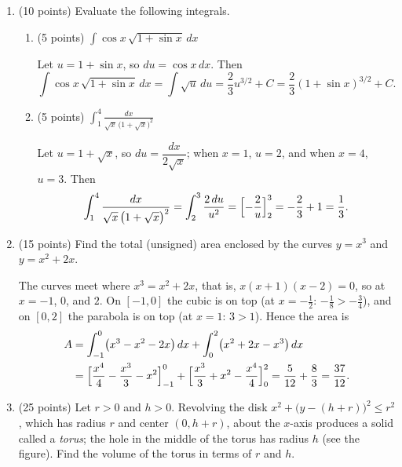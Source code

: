 \documentclass[12pt,letterpaper]{article}
\newcommand{\points}[1]{(#1 points)}
\newcommand{\workspace}{\vfill\newpage}
\begin{document}
\begin{enumerate}[label=\textbf{\arabic*.},leftmargin=2em]
  \item \points{10}
    Evaluate the following integrals.
    \begin{enumerate}[label=(\alph*)]
      \item \points{5}\quad
        $\displaystyle\int\cos x\,\sqrt{1+\sin x}\,dx$

        \begin{solution}
          Let $u=1+\sin x$, so $du=\cos x\,dx$. Then
          \[
            \int\cos x\,\sqrt{1+\sin x}\,dx=\int\sqrt{u}\,du
            =\frac23u^{3/2}+C=\frac23(1+\sin x)^{3/2}+C.
          \]
        \end{solution}
        \vfill

      \item \points{5}\quad
        $\displaystyle\int_1^4\frac{dx}{\sqrt{x}\,\bigl(1+\sqrt{x}\bigr)^2}$

        \begin{solution}
          Let $u=1+\sqrt{x}$, so $du=\dfrac{dx}{2\sqrt{x}}$; when $x=1$,
          $u=2$, and when $x=4$, $u=3$. Then
          \[
            \int_1^4\frac{dx}{\sqrt{x}\,\bigl(1+\sqrt{x}\bigr)^2}
            =\int_2^3\frac{2\,du}{u^2}
            =\Bigl[-\frac{2}{u}\Bigr]_2^3=-\frac23+1=\frac13.
          \]
        \end{solution}
        \vfill
    \end{enumerate}
    \newpage

  \item \points{15}
    Find the total (unsigned) area enclosed by the curves $y=x^3$ and
    $y=x^2+2x$.

    \begin{solution}
      The curves meet where $x^3=x^2+2x$, that is, $x(x+1)(x-2)=0$, so at
      $x=-1$, $0$, and $2$. On $[-1,0]$ the cubic is on top (at
      $x=-\tfrac12$: $-\tfrac18>-\tfrac34$), and on $[0,2]$ the parabola is
      on top (at $x=1$: $3>1$). Hence the area is
      \begin{align*}
        A&=\int_{-1}^{0}\bigl(x^3-x^2-2x\bigr)\,dx
           +\int_0^2\bigl(x^2+2x-x^3\bigr)\,dx\\
         &=\Bigl[\frac{x^4}{4}-\frac{x^3}{3}-x^2\Bigr]_{-1}^{0}
           +\Bigl[\frac{x^3}{3}+x^2-\frac{x^4}{4}\Bigr]_0^2
          =\frac{5}{12}+\frac83=\frac{37}{12}.
      \end{align*}
    \end{solution}
    \workspace

  \item \points{25}
    Let $r>0$ and $h>0$. Revolving the disk
    $x^2+\bigl(y-(h+r)\bigr)^2\le r^2$, which has radius $r$ and center
    $(0,h+r)$, about the $x$-axis produces a solid called a \emph{torus};
    the hole in the middle of the torus has radius $h$ (see the figure).
    Find the volume of the torus in terms of $r$ and $h$.


\end{enumerate}
\end{document}
